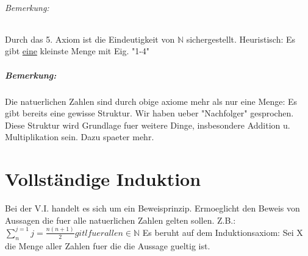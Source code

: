 \subparagraph{Bemerkung:}
Durch das 5. Axiom ist die Eindeutigkeit von $\mathbb{N}$ sichergestellt. Heuristisch: Es gibt \underline{eine} kleinste Menge mit Eig. "1-4"

\paragraph{Bemerkung:}
Die natuerlichen Zahlen sind durch obige axiome mehr als nur eine Menge: Es gibt bereits eine gewisse Struktur. Wir haben ueber "Nachfolger" gesprochen. Diese Struktur wird Grundlage fuer weitere Dinge, insbesondere Addition u. Multiplikation sein. Dazu spaeter mehr.

\chapter{Vollständige Induktion}
Bei der V.I. handelt es sich um ein Beweisprinzip. Ermoeglicht den Beweis von Aussagen die fuer alle natuerlichen Zahlen gelten sollen.\newline
Z.B.: $\sum_{n}^{j=1} j = \frac{n(n+1)}{2} gitl fuer alle n \in \mathbb{N}$\newline
Es beruht auf dem Induktionsaxiom:\newline
Sei X die Menge aller Zahlen fuer die die Aussage gueltig ist.